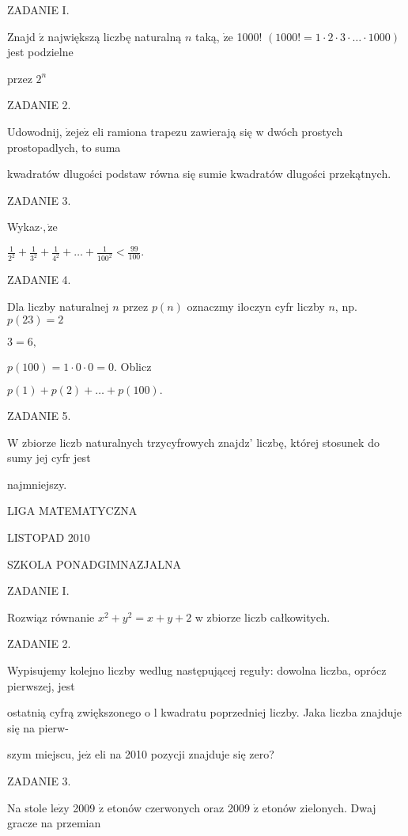 \documentclass[a4paper,12pt]{article}
\begin{document}
ZADANIE I.

Znajd $\acute{\mathrm{z}}$ największą liczbę naturalną $n$ taką, $\dot{\mathrm{z}}\mathrm{e}$ 1000! $(1000!=1\cdot 2\cdot 3\cdot\ldots\cdot 1000)$ jest podzielne

przez $2^{n}$

ZADANIE 2.

Udowodnij, $\dot{\mathrm{z}}\mathrm{e}\mathrm{j}\mathrm{e}\dot{\mathrm{z}}$ eli ramiona trapezu zawierają się w dwóch prostych prostopadlych, to suma

kwadratów dlugości podstaw równa się sumie kwadratów dlugości przekątnych.

ZADANIE 3.

Wykaz$\cdot, \dot{\mathrm{z}}\mathrm{e}$

$\displaystyle \frac{1}{2^{2}}+\frac{1}{3^{2}}+\frac{1}{4^{2}}+\ldots+\frac{1}{100^{2}}<\frac{99}{100}.$

ZADANIE 4.

Dla liczby naturalnej $n$ przez $p(n)$ oznaczmy iloczyn cyfr liczby $n$, np. $p(23) = 2$

$3 = 6,$

$p(100)=1\cdot 0\cdot 0=0$. Oblicz

$p(1)+p(2)+\ldots+p(100).$

ZADANIE 5.

W zbiorze liczb naturalnych trzycyfrowych znajdz' liczbę, której stosunek do sumy jej cyfr jest

najmniejszy.






LIGA MATEMATYCZNA

LISTOPAD 2010

SZKOLA PONADGIMNAZJALNA

ZADANIE I.

Rozwiąz równanie $x^{2}+y^{2}=x+y+2$ w zbiorze liczb całkowitych.

ZADANIE 2.

Wypisujemy kolejno liczby wedlug następującej reguły: dowolna liczba, oprócz pierwszej, jest

ostatnią cyfrą zwiększonego o l kwadratu poprzedniej liczby. Jaka liczba znajduje się na pierw-

szym miejscu, $\mathrm{j}\mathrm{e}\dot{\mathrm{z}}$ eli na 2010 pozycji znajduje się zero?

ZADANIE 3.

Na stole $\mathrm{l}\mathrm{e}\dot{\mathrm{z}}\mathrm{y}$ 2009 $\dot{\mathrm{z}}$ etonów czerwonych oraz 2009 $\dot{\mathrm{z}}$ etonów zielonych. Dwaj gracze na przemian
\end{document}
